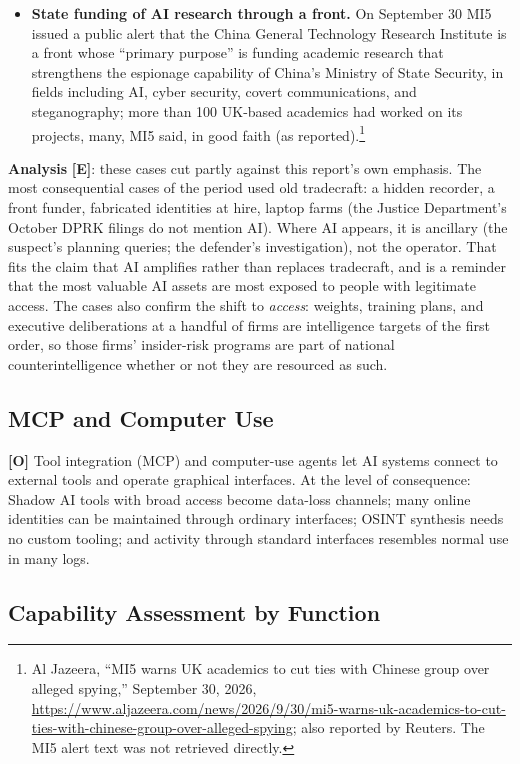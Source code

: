 \documentclass[11pt,letterpaper]{article}
\begin{document}
\begin{itemize}
  \item \textbf{State funding of AI research through a front.} On September 30 MI5 issued a public alert that the China General Technology Research Institute is a front whose ``primary purpose'' is funding academic research that strengthens the espionage capability of China's Ministry of State Security, in fields including AI, cyber security, covert communications, and steganography; more than 100 UK-based academics had worked on its projects, many, MI5 said, in good faith (as reported).\footnote{Al Jazeera, ``MI5 warns UK academics to cut ties with Chinese group over alleged spying,'' September 30, 2026, \url{https://www.aljazeera.com/news/2026/9/30/mi5-warns-uk-academics-to-cut-ties-with-chinese-group-over-alleged-spying}; also reported by Reuters. The MI5 alert text was not retrieved directly.}
\end{itemize}

\textbf{Analysis} \textbf{[E]}: these cases cut partly against this report's own emphasis. The most consequential cases of the period used old tradecraft: a hidden recorder, a front funder, fabricated identities at hire, laptop farms (the Justice Department's October DPRK filings do not mention AI). Where AI appears, it is ancillary (the suspect's planning queries; the defender's investigation), not the operator. That fits the claim that AI amplifies rather than replaces tradecraft, and is a reminder that the most valuable AI assets are most exposed to people with legitimate access. The cases also confirm the shift to \textit{access}: weights, training plans, and executive deliberations at a handful of firms are intelligence targets of the first order, so those firms' insider-risk programs are part of national counterintelligence whether or not they are resourced as such.

\subsection{MCP and Computer Use}

\textbf{[O]} Tool integration (MCP) and computer-use agents let AI systems connect to external tools and operate graphical interfaces. At the level of consequence: Shadow AI tools with broad access become data-loss channels; many online identities can be maintained through ordinary interfaces; OSINT synthesis needs no custom tooling; and activity through standard interfaces resembles normal use in many logs.

\subsection{Capability Assessment by Function}
\end{document}
